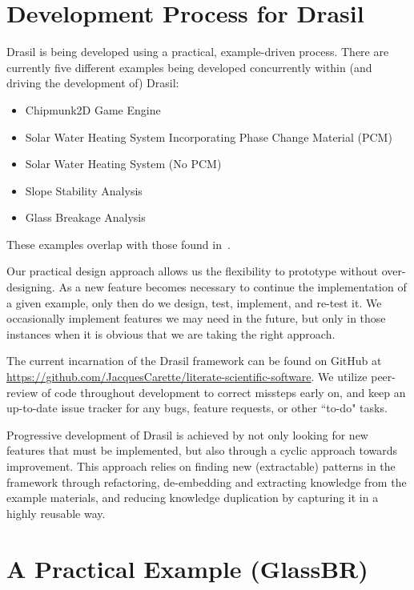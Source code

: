 \documentclass[sigconf]{acmart}
\begin{document}
\section{Development Process for Drasil} \label{SecDevProcess}

Drasil is being developed using a practical, example-driven process. There are 
currently five different examples being developed concurrently within (and 
driving the development of) Drasil:

\begin{itemize}
\item Chipmunk2D Game Engine
\item Solar Water Heating System Incorporating Phase Change Material (PCM)
\item Solar Water Heating System (No PCM)
\item Slope Stability Analysis
\item Glass Breakage Analysis
\end{itemize}
These examples overlap with those found in~\cite{SmithJegatheesanAndKelly2016}.

Our practical design approach allows us the flexibility to prototype without 
over-designing. As a new feature becomes necessary to continue the 
implementation of a given example, only then do we design, test, implement, and 
re-test it. We occasionally implement features we may need in the future, but 
only in those instances when it is obvious that we are taking the right 
approach.

The current incarnation of the Drasil framework can be found on GitHub at 
\href{https://github.com/JacquesCarette/literate-scientific-software}
{https://github.com/JacquesCarette/literate-scientific-software}. We utilize 
peer-review of code throughout development to correct missteps early on, and 
keep an up-to-date issue tracker for any bugs, feature requests, or other 
``to-do" tasks.

Progressive development of Drasil is achieved by not only looking for new 
features that must be implemented, but also through a cyclic approach towards 
improvement. This approach relies on finding new (extractable) patterns in the 
framework through refactoring, de-embedding and extracting knowledge from the 
example materials, and reducing knowledge duplication by capturing it in a 
highly reusable way.


\section{A Practical Example (GlassBR)} \label{SecGlassBR}
\end{document}
